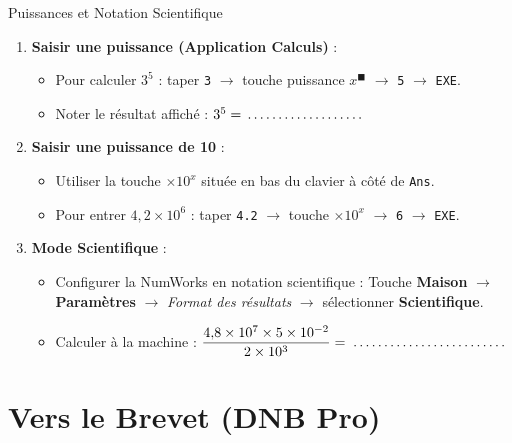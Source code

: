 \begin{tpinfo}{Puissances et Notation Scientifique}
\begin{enumerate}
    \item \textbf{Saisir une puissance (Application Calculs)} :
    \begin{itemize}
        \item Pour calculer $3^5$ : taper \texttt{3} $\rightarrow$ touche puissance \texttt{$x^\blacksquare$} $\rightarrow$ \texttt{5} $\rightarrow$ \texttt{EXE}.
        \item Noter le résultat affiché : $3^5 = \pointille[3cm]$
    \end{itemize}
    \item \textbf{Saisir une puissance de 10} :
    \begin{itemize}
        \item Utiliser la touche \texttt{$\times 10^x$} située en bas du clavier à côté de \texttt{Ans}.
        \item Pour entrer $4{,}2 \times 10^6$ : taper \texttt{4.2} $\rightarrow$ touche \texttt{$\times 10^x$} $\rightarrow$ \texttt{6} $\rightarrow$ \texttt{EXE}.
    \end{itemize}
    \item \textbf{Mode Scientifique} :
    \begin{itemize}
        \item Configurer la NumWorks en notation scientifique : Touche \textbf{Maison} $\rightarrow$ \textbf{Paramètres} $\rightarrow$ \textit{Format des résultats} $\rightarrow$ sélectionner \textbf{Scientifique}.
        \item Calculer à la machine : $\dfrac{4{,}8 \times 10^7 \times 5 \times 10^{-2}}{2 \times 10^3} = \pointille[4cm]$
    \end{itemize}
\end{enumerate}
\end{tpinfo}

\section{Vers le Brevet (DNB Pro)}


